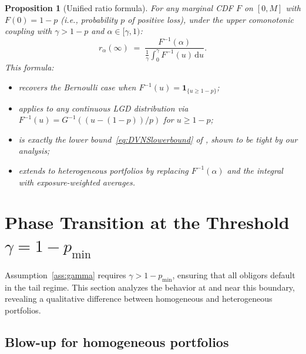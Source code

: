 \documentclass[11pt]{article}
\newtheorem{proposition}[theorem]{Proposition}
\theoremstyle{definition}
\newcommand{\dd}{\mathrm{d}}
\newcommand{\1}{\mathbf{1}}
\begin{document}
\begin{proposition}[Unified ratio formula]\label{prop:unified}
For any marginal CDF $F$ on $[0,M]$ with $F(0) = 1-p$ (i.e., probability $p$ of positive loss), under the upper comonotonic coupling with $\gamma > 1-p$ and $\alpha \in [\gamma, 1)$:
\begin{equation}\label{eq:unified}
  r_\alpha(\infty) \;=\; \frac{F^{-1}(\alpha)}{\frac{1}{\gamma}\displaystyle\int_0^\gamma F^{-1}(u)\,\dd u}.
\end{equation}
This formula:
\begin{itemize}
  \item recovers the Bernoulli case when $F^{-1}(u) = \1_{\{u \geq 1-p\}}$;
  \item applies to any continuous LGD distribution via $F^{-1}(u) = G^{-1}((u-(1-p))/p)$ for $u \geq 1-p$;
  \item is exactly the lower bound~\eqref{eq:DVNSlowerbound} of \citet{DVNSupper}, shown to be tight by our analysis;
  \item extends to heterogeneous portfolios by replacing $F^{-1}(\alpha)$ and the integral with exposure-weighted averages.
\end{itemize}
\end{proposition}

\section{Phase Transition at the Threshold $\gamma = 1 - p_{\min}$}\label{sec:phase}

Assumption~\ref{ass:gamma} requires $\gamma > 1 - p_{\min}$, ensuring that all obligors default in the tail regime. This section analyzes the behavior at and near this boundary, revealing a qualitative difference between homogeneous and heterogeneous portfolios.

\subsection{Blow-up for homogeneous portfolios}
\end{document}
